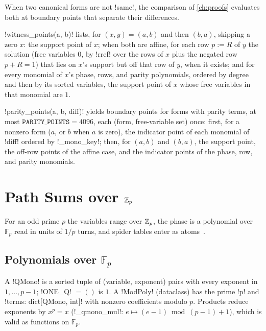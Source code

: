 When two canonical forms are not \py!same!, the comparison of \cref{ch:proofs} evaluates both at boundary points that separate their differences.

\begin{definition}\label{def:algebra-witness-points}
\py!witness_points(a, b)! lists, for $(x,y)=(a,b)$ and then $(b,a)$, skipping a zero $x$: the support point of $x$; when both are affine, for each row $p:=R$ of $y$ the solution (free variables $0$, by \py!rref! over the rows of $x$ plus the negated row $p+R=1$) that lies on $x$'s support but off that row of $y$, when it exists; and for every monomial of $x$'s phase, rows, and parity polynomials, ordered by degree and then by its sorted variables, the support point of $x$ whose free variables in that monomial are $1$.
\end{definition}

\py!parity_points(a, b, diff)! yields boundary points for forms with parity terms, at most $\mathtt{PARITY\_POINTS}=4096$, each (form, free-variable set) once: first, for a nonzero form ($a$, or $b$ when $a$ is zero), the indicator point of each monomial of \code!diff! ordered by \py!_mono_key!; then, for $(a,b)$ and $(b,a)$, the support point, the off-row points of the affine case, and the indicator points of the phase, row, and parity monomials.

\section{Path Sums over \texorpdfstring{$\mathbb{Z}_{p}$}{Zp}}\label{sec:algebra-qudit}

For an odd prime $p$ the variables range over $\mathbb{Z}_{p}$, the phase is a polynomial over $\mathbb{F}_p$ read in units of $1/p$ turns, and spider tables enter as atoms~\cite{poor2023qupit}.

\subsection{Polynomials over \texorpdfstring{$\mathbb{F}_p$}{F\_p}}

\begin{definition}\label{def:algebra-modpoly}
A \py!QMono! is a sorted tuple of (variable, exponent) pairs with every exponent in $1,\ldots,p-1$; \py!ONE_Q! $=()$ is $1$. A \py!ModPoly! (dataclass) has the prime \py!p! and \py!terms: dict[QMono, int]! with nonzero coefficients modulo $p$. Products reduce exponents by $x^p=x$ (\py!_qmono_mul!: $e\mapsto(e-1)\bmod(p-1)+1$), which is valid as functions on $\mathbb{F}_p$.
\end{definition}

